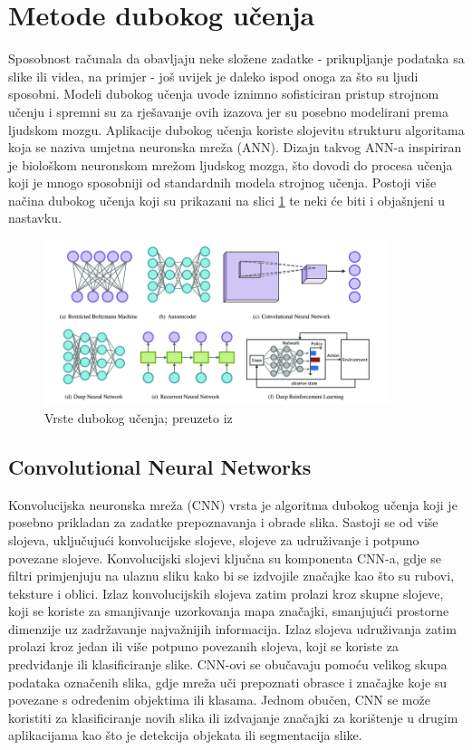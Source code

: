 \documentclass[]{foi}
\begin{document}
\section{Metode dubokog učenja}
Sposobnost računala da obavljaju neke složene zadatke - prikupljanje podataka sa slike ili videa, na primjer - još uvijek je daleko ispod onoga za što su ljudi sposobni. Modeli dubokog učenja uvode iznimno sofisticiran pristup strojnom učenju i spremni su za rješavanje ovih izazova jer su posebno modelirani prema ljudskom mozgu. Aplikacije dubokog učenja koriste slojevitu strukturu algoritama koja se naziva umjetna neuronska mreža (ANN). Dizajn takvog ANN-a inspiriran je biološkom neuronskom mrežom ljudskog mozga, što dovodi do procesa učenja koji je mnogo sposobniji od standardnih modela strojnog učenja. \cite{Wolfewicz} Postoji više načina dubokog učenja koji su prikazani na slici \ref{fig:deep-graf} te neki će biti i objašnjeni u nastavku.

\begin{figure}[!h]
    \centering
    \includegraphics[width=0.9\textwidth]{slike/deep.jpg}
    \caption{Vrste dubokog učenja; preuzeto iz \cite{Deep}}
    \label{fig:deep-graf}
\end{figure}

\subsection{Convolutional Neural Networks}
Konvolucijska neuronska mreža (CNN) vrsta je algoritma dubokog učenja koji je posebno prikladan za zadatke prepoznavanja i obrade slika. Sastoji se od više slojeva, uključujući konvolucijske slojeve, slojeve za udruživanje i potpuno povezane slojeve. 
Konvolucijski slojevi ključna su komponenta CNN-a, gdje se filtri primjenjuju na ulaznu sliku kako bi se izdvojile značajke kao što su rubovi, teksture i oblici. Izlaz konvolucijskih slojeva zatim prolazi kroz skupne slojeve, koji se koriste za smanjivanje uzorkovanja mapa značajki, smanjujući prostorne dimenzije uz zadržavanje najvažnijih informacija. Izlaz slojeva udruživanja zatim prolazi kroz jedan ili više potpuno povezanih slojeva, koji se koriste za predviđanje ili klasificiranje slike. 
CNN-ovi se obučavaju pomoću velikog skupa podataka označenih slika, gdje mreža uči prepoznati obrasce i značajke koje su povezane s određenim objektima ili klasama. Jednom obučen, CNN se može koristiti za klasificiranje novih slika ili izdvajanje značajki za korištenje u drugim aplikacijama kao što je detekcija objekata ili segmentacija slike. \cite{GeeksforGeeks2020}
\end{document}
